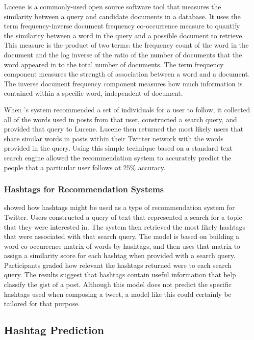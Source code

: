 \documentclass[man,floatsintext,donotrepeattitle]{apa6}
\begin{document}
Lucene \parencite{McCandless2010} is a commonly-used open source software tool that measures the similarity between a query and candidate documents in a database.
It uses the term frequency-inverse document frequency co-occurrence measure to quantify the similarity between a word in the query and a possible document to retrieve.
This measure is the product of two terms: the frequency count of the word in the document and the log inverse of the ratio of the number of documents that the word appeared in to the total number of documents.
The term frequency component measures the strength of association between a word and a document.
The inverse document frequency component measures how much information is contained within a specific word, independent of document.

When \citeauthor{Hannon2010}'s system recommended a set of individuals for a user to follow, it collected all of the words used in posts from that user, constructed a search query, and provided that query to Lucene.
Lucene then returned the most likely users that share similar words in posts within their Twitter network with the words provided in the query.
Using this simple technique based on a standard text search engine allowed the recommendation system to accurately predict the people that a particular user follows at 25\% accuracy.

\subsubsection{Hashtags for Recommendation Systems}

\textcite{Efron2010} showed how hashtags might be used as a type of recommendation system for Twitter.
Users constructed a query of text that represented a search for a topic that they were interested in.
The system then retrieved the most likely hashtags that were associated with that search query.
The model is based on building a word co-occurrence matrix of words by hashtags, and then uses that matrix to assign a similarity score for each hashtag when provided with a search query.
Participants graded how relevant the hashtags returned were to each search query.
The results suggest that hashtags contain useful information that help classify the gist of a post. 
Although this model does not predict the specific hashtags used when composing a tweet, a model like this could certainly be tailored for that purpose.

\subsection{Hashtag Prediction}
\end{document}
